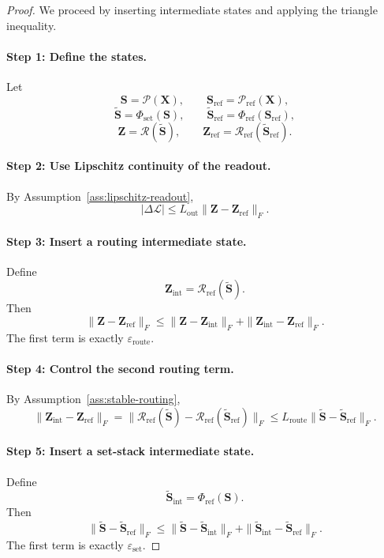 \documentclass{article}
\theoremstyle{plain}
\theoremstyle{definition}
\theoremstyle{remark}
\begin{document}
\begin{proof}
We proceed by inserting intermediate states and applying the triangle inequality.

\paragraph{Step 1: Define the states.}
Let
\[
\mathbf{S} = \mathcal{P}(\mathbf{X}), \qquad
\mathbf{S}_{\mathrm{ref}} = \mathcal{P}_{\mathrm{ref}}(\mathbf{X}),
\]
\[
\tilde{\mathbf{S}} = \Phi_{\mathrm{set}}(\mathbf{S}), \qquad
\tilde{\mathbf{S}}_{\mathrm{ref}} = \Phi_{\mathrm{ref}}(\mathbf{S}_{\mathrm{ref}}),
\]
\[
\mathbf{Z} = \mathcal{R}(\tilde{\mathbf{S}}), \qquad
\mathbf{Z}_{\mathrm{ref}} = \mathcal{R}_{\mathrm{ref}}(\tilde{\mathbf{S}}_{\mathrm{ref}}).
\]

\paragraph{Step 2: Use Lipschitz continuity of the readout.}
By Assumption~\ref{ass:lipschitz-readout},
\[
|\Delta \mathcal{L}|
\le
L_{\mathrm{out}}\|\mathbf{Z}-\mathbf{Z}_{\mathrm{ref}}\|_F.
\]

\paragraph{Step 3: Insert a routing intermediate state.}
Define
\[
\mathbf{Z}_{\mathrm{int}}
=
\mathcal{R}_{\mathrm{ref}}(\tilde{\mathbf{S}}).
\]
Then
\[
\|\mathbf{Z}-\mathbf{Z}_{\mathrm{ref}}\|_F
\le
\|\mathbf{Z}-\mathbf{Z}_{\mathrm{int}}\|_F
+
\|\mathbf{Z}_{\mathrm{int}}-\mathbf{Z}_{\mathrm{ref}}\|_F.
\]
The first term is exactly $\varepsilon_{\mathrm{route}}$.

\paragraph{Step 4: Control the second routing term.}
By Assumption~\ref{ass:stable-routing},
\[
\|\mathbf{Z}_{\mathrm{int}}-\mathbf{Z}_{\mathrm{ref}}\|_F
=
\|\mathcal{R}_{\mathrm{ref}}(\tilde{\mathbf{S}})
-
\mathcal{R}_{\mathrm{ref}}(\tilde{\mathbf{S}}_{\mathrm{ref}})\|_F
\le
L_{\mathrm{route}}
\|\tilde{\mathbf{S}}-\tilde{\mathbf{S}}_{\mathrm{ref}}\|_F.
\]

\paragraph{Step 5: Insert a set-stack intermediate state.}
Define
\[
\tilde{\mathbf{S}}_{\mathrm{int}}
=
\Phi_{\mathrm{ref}}(\mathbf{S}).
\]
Then
\[
\|\tilde{\mathbf{S}}-\tilde{\mathbf{S}}_{\mathrm{ref}}\|_F
\le
\|\tilde{\mathbf{S}}-\tilde{\mathbf{S}}_{\mathrm{int}}\|_F
+
\|\tilde{\mathbf{S}}_{\mathrm{int}}-\tilde{\mathbf{S}}_{\mathrm{ref}}\|_F.
\]
The first term is exactly $\varepsilon_{\mathrm{set}}$.


\end{proof}
\end{document}
